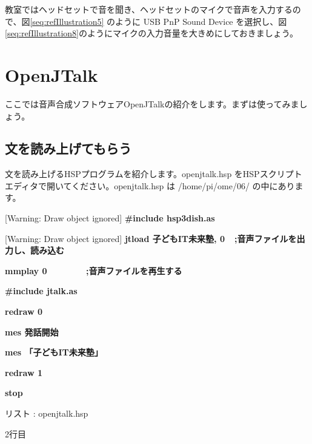 \documentclass[a4paper,dvipdfmx]{jarticle}
\newcounter{List}
\renewcommand\theList{\arabic{List}}
\begin{document}
{
教室ではヘッドセットで音を聞き、ヘッドセットのマイクで音声を入力するので、図\ref{seq:refIllustration5}
のように USB PnP Sound Device
を選択し、図\ref{seq:refIllustration8}のようにマイクの入力音量を大きめにしておきましょう。}

\section[OpenJTalk]{OpenJTalk}
{
ここでは音声合成ソフトウェアOpenJTalkの紹介をします。まずは使ってみましょう。}

\subsection[文を読み上げてもらう]{文を読み上げてもらう}
{
文を読み上げるHSPプログラムを紹介します。openjtalk.hsp
をHSPスクリプトエディタで開いてください。openjtalk.hsp
は /home/pi/ome/06/ の中にあります。}

\begin{minipage}{17.006cm}
[Warning: Draw object ignored]{\ttfamily\bfseries
\#include {\textquotedbl}hsp3dish.as{\textquotedbl}}

\begin{minipage}{15.863cm}
[Warning: Draw object ignored]{\ttfamily\bfseries
jtload {\textquotedbl}子どもIT未来塾{\textquotedbl},
0\ \ \textcolor[rgb]{0.0,0.0,0.6}{;音声ファイルを出力し、読み込む}}

{\ttfamily\bfseries
mmplay
0\ \ \ \ \ \ \ \ \textcolor[rgb]{0.0,0.0,0.6}{;音声ファイルを再生する}}
\end{minipage}{\ttfamily\bfseries
\#include {\textquotedbl}jtalk.as{\textquotedbl}}


\bigskip

{\ttfamily\bfseries
redraw 0}

{\ttfamily\bfseries
mes {\textquotedbl}発話開始{\textquotedbl}}

{\ttfamily\bfseries
mes {\textquotedbl}「子どもIT未来塾」{\textquotedbl}}

{\ttfamily\bfseries
redraw 1}


\bigskip


\bigskip

{\ttfamily\bfseries
stop}

{\upshape
リスト \stepcounter{List}{\theList}: openjtalk.hsp}
\end{minipage}

{
2行目}
\end{document}
